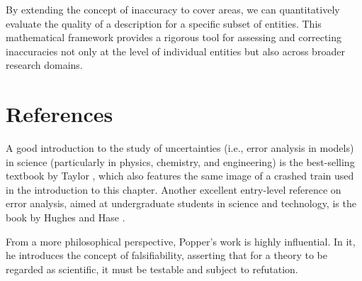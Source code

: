 By extending the concept of inaccuracy to cover areas, we can quantitatively evaluate the quality of a description for a specific subset of entities. This mathematical framework provides a rigorous tool for assessing and correcting inaccuracies not only at the level of individual entities but also across broader research domains.

%
%

\section*{References}

A good introduction to the study of uncertainties (i.e., error analysis in models) in science (particularly in physics, chemistry, and engineering) is the best-selling textbook by Taylor \cite{taylor2022introduction}, which also features the same image of a crashed train used in the introduction to this chapter. Another excellent entry-level reference on error analysis, aimed at undergraduate students in science and technology, is the book by Hughes and Hase \cite{hughes2010measurements}.

From a more philosophical perspective, Popper's work \cite{popper2014conjectures} is highly influential. In it, he introduces the concept of falsifiability, asserting that for a theory to be regarded as scientific, it must be testable and subject to refutation.



